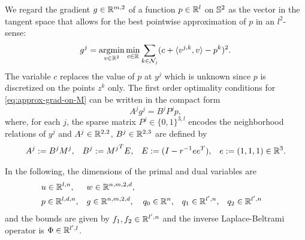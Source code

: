 We regard the gradient $g \in \mathbb{R}^{m,2}$ of a function $p \in \mathbb{R}^{l}$ on $\mathbb{S}^2$
as the vector in the tangent space that allows for the best pointwise
approximation of $p$ in an $l^2$-sense:
\begin{equation}\label{eq:approx-grad-on-M}
    g^j = \argmin_{v \in \IR^2} \min_{c \in \IR} \sum_{k \in \nbhd_j} (
        c + \langle v^{j,k}, v \rangle - p^k
    )^2.
\end{equation}
The variable $c$ replaces the value of $p$ at $y^j$ which is unknown since $p$
is discretized on the points $z^k$ only.
The first order optimality conditions for \eqref{eq:approx-grad-on-M} can be
written in the compact form
\begin{equation}
    A^j g^j = B^j P^j p,
\end{equation}
where, for each $j$, the sparse matrix $P^j \in \{0,1\}^{3,l}$ encodes the neighborhood
relations of $y^j$ and $A^j \in \mathbb{R}^{2,2}$, $B^j \in \mathbb{R}^{2,3}$ are defined by
\begin{align}
    A^j := B^j M^j, &&
    B^j := {M^j}^T E, &&
    E := (I - r^{-1} ee^T), &&
    e := (1, 1, 1) \in \mathbb{R}^3.
\end{align}

In the following, the dimensions of the primal and dual variables are 
\begin{align*}
    & u \in \mathbb{R}^{l,n}, && w \in \mathbb{R}^{n,m,2,d}, \\
    & p \in \mathbb{R}^{l,d,n}, && g \in \mathbb{R}^{n,m,2,d}, && q_0 \in \mathbb{R}^{n},
        && q_1 \in \mathbb{R}^{l',n}, && q_2 \in \mathbb{R}^{l',n}
\end{align*}
and the bounds are given by $f_1, f_2 \in \mathbb{R}^{l',n}$ and the inverse
Laplace-Beltrami operator is $\Phi \in \mathbb{R}^{l',l}$.
